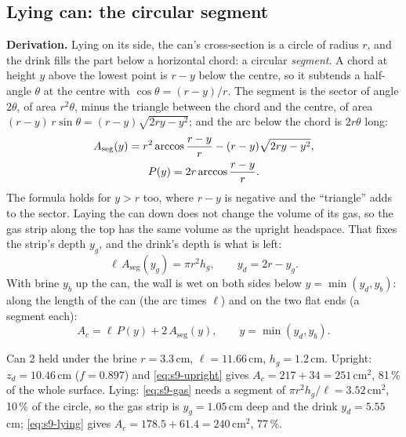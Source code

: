 \documentclass[11pt,a4paper]{article}
\newcommand{\Aseg}{A_{\mathrm{seg}}}
\newcommand{\para}[1]{\par\smallskip\noindent\textbf{#1}\enspace}
\begin{document}
\subsection{Lying can: the circular segment}
\para{Derivation.} Lying on its side, the can's cross-section is a circle of radius $r$, and the drink fills
the part below a horizontal chord: a circular \emph{segment}. A chord at height $y$ above the lowest point
is $r - y$ below the centre, so it subtends a half-angle $\theta$ at the centre with $\cos\theta = (r - y)/r$.
The segment is the sector of angle $2\theta$, of area $r^2\theta$, minus the triangle between the chord and the
centre, of area $(r - y)\,r\sin\theta = (r - y)\sqrt{2ry - y^2}$; and the arc below the chord is $2r\theta$
long:
\begin{gather}
\Aseg(y) = r^2\arccos\frac{r - y}{r} - (r - y)\sqrt{2ry - y^2}, \label{eq:s9-segment}\\
P(y) = 2r\arccos\frac{r - y}{r}. \notag
\end{gather}
The formula holds for $y > r$ too, where $r - y$ is negative and the ``triangle'' adds to the sector. Laying
the can down does not change the volume of its gas, so the gas strip along the top has the same volume as
the upright headspace. That fixes the strip's depth $y_g$, and the drink's depth is what is left:
\begin{equation}
\ell\,\Aseg(y_g) = \pi r^2h_g, \qquad y_d = 2r - y_g . \label{eq:s9-gas}
\end{equation}
With brine $y_b$ up the can, the wall is wet on both sides below $y = \min(y_d, y_b)$: along the length of
the can (the arc times $\ell$) and on the two flat ends (a segment each):
\begin{equation}
A_c = \ell\,P(y) + 2\,\Aseg(y),\qquad y = \min(y_d, y_b). \label{eq:s9-lying}
\end{equation}

\begin{worked}{Can 2 held under the brine}
$r = 3.3$\,cm, $\ell = 11.66$\,cm, $h_g = 1.2$\,cm. Upright: $z_d = 10.46$\,cm ($f = 0.897$) and
\eqref{eq:s9-upright} gives $A_c = 217 + 34 = 251$\,cm$^2$, 81\,\% of the whole surface. Lying:
\eqref{eq:s9-gas} needs a segment of $\pi r^2h_g/\ell = 3.52$\,cm$^2$, 10\,\% of the circle, so the gas strip is
$y_g = 1.05$\,cm deep and the drink $y_d = 5.55$\,cm; \eqref{eq:s9-lying} gives $A_c = 178.5 + 61.4 = 240$\,cm$^2$,
77\,\%.
\end{worked}
\end{document}
